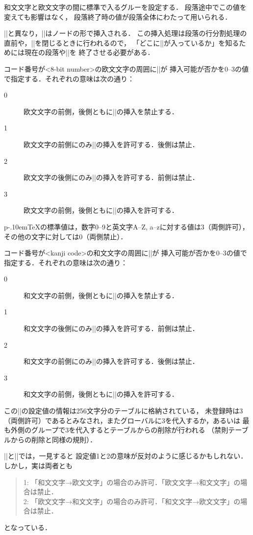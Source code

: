 \documentclass[a4paper,11pt,nomag]{jsarticle}
\def\pTeX{p\kern-.10em\TeX}
\begin{document}
\begin{cslist}
\csitem[\.{xkanjiskip}=<skip>]
  和文文字と欧文文字の間に標準で入るグルーを設定する．
  段落途中でこの値を変えても影響はなく，
  段落終了時の値が段落全体にわたって用いられる．
\end{cslist}
\begin{dangerous}
  |\kanjiskip|と異なり，|\xkanjiskip|はノードの形で挿入される．
  この挿入処理は段落の行分割処理の直前や，|\hbox|を閉じるときに行われるので，
  「どこに|\xkanjiskip|が入っているか」を知るためには現在の段落や|\hbox|を
  終了させる必要がある．
\end{dangerous}

\begin{cslist}
\csitem[\.{xspcode} <8-bit number>=<0--3>]
  コード番号が<8-bit number>の欧文文字の周囲に|\xkanjiskip|が
  挿入可能が否かを0--3の値で指定する．それぞれの意味は次の通り：
  \begin{description}
    \item[0] 欧文文字の前側，後側ともに|\xkanjiskip|の挿入を禁止する．
    \item[1] 欧文文字の前側にのみ|\xkanjiskip|の挿入を許可する．後側は禁止．
    \item[2] 欧文文字の後側にのみ|\xkanjiskip|の挿入を許可する．前側は禁止．
    \item[3] 欧文文字の前側，後側ともに|\xkanjiskip|の挿入を許可する．
  \end{description}
  \pTeX の標準値は，数字0--9と英文字A--Z, a--zに対する値は3（両側許可），
  その他の文字に対しては0（両側禁止）．

\csitem[\.{inhibitxspcode} <kanji code>=<0--3>]
  コード番号が<kanji code>の和文文字の周囲に|\xkanjiskip|が
  挿入可能が否かを0--3の値で指定する．それぞれの意味は次の通り：
  \begin{description}
    \item[0] 和文文字の前側，後側ともに|\xkanjiskip|の挿入を禁止する．
    \item[1] 和文文字の後側にのみ|\xkanjiskip|の挿入を許可する．前側は禁止．
    \item[2] 和文文字の前側にのみ|\xkanjiskip|の挿入を許可する．後側は禁止．
    \item[3] 和文文字の前側，後側ともに|\xkanjiskip|の挿入を許可する．
  \end{description}
  この|\inhibitxspcode|の設定値の情報は256文字分のテーブルに格納されている，
  未登録時は3（両側許可）であるとみなされ，またグローバルに3を代入するか，あるいは
  最も外側のグループで3を代入するとテーブルからの削除が行われる
  （禁則テーブルからの削除と同様の規則）．
\end{cslist}
\begin{dangerous}
  |\xspcode|と|\inhibitxspcode|では，一見すると
  設定値1と2の意味が反対のように感じるかもしれない．しかし，実は両者とも
  \begin{quote}
    1: 「和文文字→欧文文字」の場合のみ許可．「欧文文字→和文文字」の場合は禁止．\\
    2: 「欧文文字→和文文字」の場合のみ許可．「和文文字→欧文文字」の場合は禁止．
  \end{quote}
  となっている．
\end{dangerous}
\end{document}

